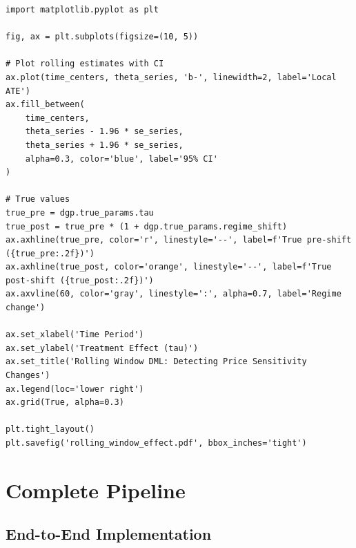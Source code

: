 \begin{verbatim}
import matplotlib.pyplot as plt

fig, ax = plt.subplots(figsize=(10, 5))

# Plot rolling estimates with CI
ax.plot(time_centers, theta_series, 'b-', linewidth=2, label='Local ATE')
ax.fill_between(
    time_centers,
    theta_series - 1.96 * se_series,
    theta_series + 1.96 * se_series,
    alpha=0.3, color='blue', label='95% CI'
)

# True values
true_pre = dgp.true_params.tau
true_post = true_pre * (1 + dgp.true_params.regime_shift)
ax.axhline(true_pre, color='r', linestyle='--', label=f'True pre-shift ({true_pre:.2f})')
ax.axhline(true_post, color='orange', linestyle='--', label=f'True post-shift ({true_post:.2f})')
ax.axvline(60, color='gray', linestyle=':', alpha=0.7, label='Regime change')

ax.set_xlabel('Time Period')
ax.set_ylabel('Treatment Effect (tau)')
ax.set_title('Rolling Window DML: Detecting Price Sensitivity Changes')
ax.legend(loc='lower right')
ax.grid(True, alpha=0.3)

plt.tight_layout()
plt.savefig('rolling_window_effect.pdf', bbox_inches='tight')
\end{verbatim}


\section{Complete Pipeline}\label{sec:complete_pipeline}

\subsection{End-to-End Implementation}

